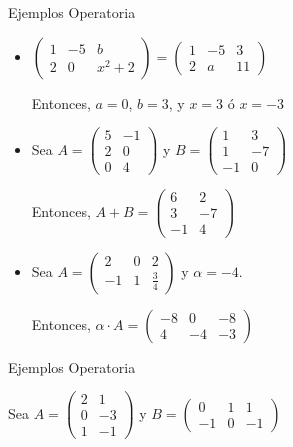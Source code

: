 {Ejemplos Operatoria}

\begin{itemize}
\item
$
 \left(
\begin{array}{ccc}
1 & -5 & b\\
2 & 0 & x^2+2
\end{array}
\right)
=
 \left(
\begin{array}{ccc}
1 & -5 & 3 \\
2 & a &  11
\end{array}
\right)
$


Entonces, $a= 0$, $b=3$, y $x=3$ ó  $x=-3$

\item
 Sea $A= 
\left(
\begin{array}{cc}
5 & -1 \\
2 & 0 \\
0 & 4
\end{array}
\right)
$
 y
$B=  \left(
\begin{array}{cc}
1  & 3 \\
1  & -7\\
-1 & 0
\end{array}
\right)
$


Entonces, $A+B=
\left(
\begin{array}{cc}
6  & 2 \\
3  & -7\\
-1 & 4
\end{array}
\right)
$


\item
Sea $A=
\left(
\begin{array}{ccc}
2 &  0  & 2 \\
-1 & 1 & \frac{3}{4}
\end{array}
\right)
$
y
$\alpha = -4$.


Entonces, $\alpha \cdot A=
\left(
\begin{array}{ccc}
-8 &  0  & -8 \\
4  & -4  & -3
\end{array}
\right)
$
\end{itemize}


{Ejemplos Operatoria}

Sea $A=
\left(
\begin{array}{cc}
2 &  1  \\
0 & -3 \\
1 & -1
\end{array}
\right)
$
y
$B=  \left(
\begin{array}{ccc}
0  & 1  & 1\\
-1 & 0  & -1
\end{array}
\right)
$


